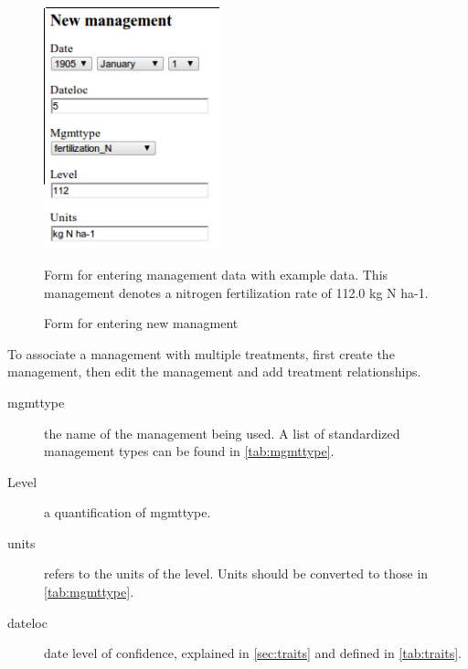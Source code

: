 \documentclass[12pt,english,portrait]{article}
\begin{document}
\begin{figure}
  \includegraphics[width=2in]{figures/management_new.png} 
  \caption{Form for entering new managment}{Form for entering management data with example data. This management denotes a nitrogen fertilization rate of 112.0 kg N ha-1.}
\label{fig:management_new}
\end{figure}
 
To associate a management with multiple treatments, first create the management, then edit the management and add treatment relationships. 

 \begin{description}
 \item[mgmttype] the name of the management being used. A list of standardized management types can be found in \autoref{tab:mgmttype}.
 \item[Level] a quantification of mgmttype. 
 \item[units] refers to the units of the level. Units should be converted to those in \autoref{tab:mgmttype}.
 \item[dateloc] date level of confidence, explained in \autoref{sec:traits} and defined in \autoref{tab:traits}.
\end{description}
\end{document}
